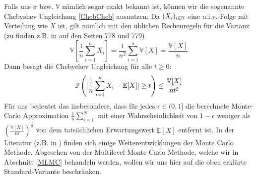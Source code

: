  	Falls uns $ \sigma $ bzw. $ \mathbb{V} $ nämlich sogar exakt bekannt ist, können wir die sogenannte Chebyshev Ungleichung \ref{ChebCheb} ausnutzen:
 	Da $ (X_i)_{i \in \mathbb{N}} $ eine u.i.v.-Folge mit Verteilung wie $ X $ ist, gilt nämlich mit den üblichen Rechenregeln für die Varianz (zu finden z.B. in \cite{brokate2016grundwissen} auf den Seiten 778 und 779)
 	\[
 		\mathbb{V}[\frac{1}{n}\sum_{i=1}^{n}X_i] =  \frac{1}{n^2} \sum_{i=1}^{n} \mathbb{V}[X] = \frac{\mathbb{V}[X]}{n}
 	\]
 	Dann besagt die Chebychev Ungleichung für alle $ t \geq 0 $:
 	\[
 		\mathbb{P}\left(| \frac{1}{n}\sum_{i=1}^{n}X_i-\mathbb{E}[X] | \geq t \right) \leq \frac{\mathbb{V}[X]}{nt^2}
 	\]
 	Für uns bedeutet das insbesondere, dass für jedes $ \epsilon \in (0,1] $  die berechnete Monte-Carlo Approximation $ \frac{1}{n}\sum_{i=1}^{N} $ mit einer Wahrscheinlichkeit von $ 1-\epsilon $ weniger als $ (\frac{\mathbb{V}[X]}{n\epsilon})^{\frac{1}{2}} $ von dem tatsächlichen Erwartungswert $ \mathbb{E}[X] $ entfernt ist.
 	In der Literatur (z.B. in \cite{sullivan2015introduction}) finden sich einige Weiterentwicklungen der Monte Carlo Methode. Abgesehen von der Multilevel Monte Carlo Methode, welche wir in Abschnitt \ref{MLMC} behandeln werden, wollen wir uns hier auf die oben erklärte Standard-Variante beschränken.
 	
 
 	
	
	
	


